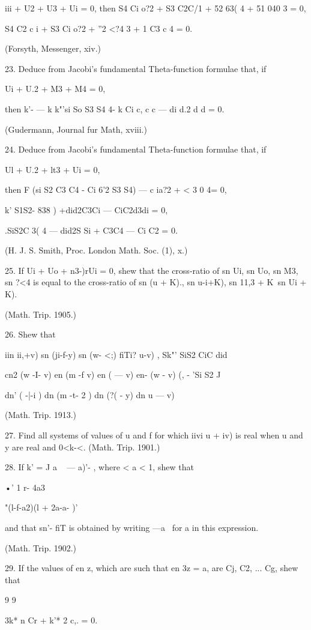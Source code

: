iii + U2 + U3 + Ui = 0, then S4 Ci o?2 + S3 C2C/1 + 52 63( 4 + 51 040
3 = 0,

S4 C2 c i + S3 Ci o?2 + ''2 <?4 3 + 1 C3 c 4 = 0.

(Forsyth, Messenger, xiv.)

23. Deduce from Jacobi's fundamental Theta-function formulae that, if

Ui + U.2 + M3 + M4 = 0,

then k'- — k k"'si So S3 S4 4- k Ci c, c c — di d.2 d d = 0.

(Gudermann, Journal fur Math, xviii.)

24. Deduce from Jacobi's fundamental Theta-function formulae that, if

Ul + U.2 + lt3 + Ui = 0,

then F (si S2 C3 C4 - Ci 6'2 S3 S4) — c ia?2 + < 3 0 4= 0,

k' S1S2- 838 ) +did2C3Ci — CiC2d3di = 0,

.SiS2C 3( 4 — did2S Si + C3C4 — Ci C2 = 0.

(H. J. S. Smith, Proc. London Math. Soc. (1), x.)

25. If Ui + Uo + n3-)rUi = 0, shew that the cross-ratio of sn Ui, sn
Uo, sn M3, sn ?<4 is equal to the cross-ratio of sn (u + K)., sn
u-i+K), sn 11,3 + K\ sn Ui + K).

(Math. Trip. 1905.)

26. Shew that

iin ii,+v) sn (ji-f-y) sn (w- <;) fiTi? u-v) , Sk"' SiS2 CiC did

cn2 (w -I- v) en (m -f v) en ( — v) en- (w - v) (, - 'Si S2 J

dn' ( -|-i ) dn (m -t- 2 ) dn (?( - y) dn u — v)

(Math. Trip. 1913.)

27. Find all systems of values of u and f for which iivi u + iv) is
real when u and y are real and 0<k-<. (Math. Trip. 1901.)

28. If k' = J a ~ — a)'- , where < a < 1, shew that

•' 1 r- 4a3

 "(l-f-a2)(l + 2a-a- )'

and that sn'- fiT is obtained by writing —a~ for a in this expression.

(Math. Trip. 1902.)

29. If the values of en z, which are such that en 3z = a, are Cj, C2,
... Cg, shew that

9 9

3k* n Cr + k'* 2 c,. = 0.

